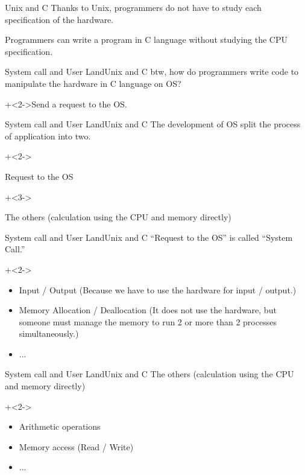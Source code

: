 \begin{frame}{Unix and C}{}
    Thanks to Unix, programmers do not have to study each specification of the hardware.
    \vspace{4ex}

    Programmers can write a program in C language without studying the CPU specification.
\end{frame}


\begin{frame}{System call and User Land}{Unix and C}
    btw, how do programmers write code to manipulate the hardware in C language on OS?
    \vspace{4ex}

    \onslide+<2->{Send a request to the OS.}
\end{frame}


\begin{frame}{System call and User Land}{Unix and C}
    The development of OS split the process of application into two.
    \vspace{4ex}

    \begin{itemize}
        \onslide+<2->{\item Request to the OS}
        \onslide+<3->{\item The others (calculation using the CPU and memory directly)}
    \end{itemize}
\end{frame}


\begin{frame}{System call and User Land}{Unix and C}
    ``Request to the OS'' is called ``System Call.''
    \vspace{4ex}

    \onslide+<2->{
        \begin{itemize}
            \item Input / Output (Because we have to use the hardware for input / output.)
            \item Memory Allocation / Deallocation (It does not use the hardware, but someone must manage the memory to run 2 or more than 2 processes simultaneously.)
            \item ...
        \end{itemize}
    }
\end{frame}


\begin{frame}{System call and User Land}{Unix and C}
    The others (calculation using the CPU and memory directly)
    \vspace{4ex}

    \onslide+<2->{
        \begin{itemize}
            \item Arithmetic operations
            \item Memory access (Read / Write)
            \item ...
        \end{itemize}
    }
\end{frame}

